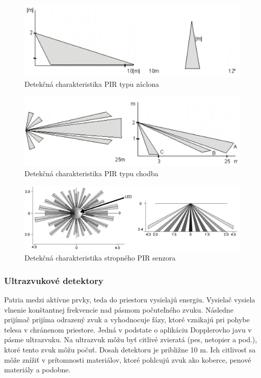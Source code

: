 \begin{figure}[!ht]
    \centering
    \includegraphics[width=0.75\linewidth]{obrazky-figures/PIR-zaclona.png}
    \caption[Detekčná charakteristika PIR typu záclona]{Detekčná charakteristika PIR typu záclona\cite{velas_ezs}}
    \label{fig:pir-zaclona}
\end{figure}

\begin{figure}[!ht]
    \centering
    \includegraphics[width=0.75\linewidth]{obrazky-figures/PIR-chodba.png}
    \caption[Detekčná charakteristika PIR typu chodba]{Detekčná charakteristika PIR typu chodba\cite{velas_ezs}}
    \label{fig:pir-chodba}
\end{figure}

\begin{figure}[!ht]
    \centering
    \includegraphics[width=0.75\linewidth]{obrazky-figures/PIR-strop.jpg}
    \caption[Detekčná charakteristika stropného PIR senzora]{Detekčná charakteristika stropného PIR senzora\cite{PIR-strop}}
    \label{fig:pir-strop}
\end{figure}

\subsubsection{Ultrazvukové detektory}

Patria medzi aktívne prvky, teda do priestoru vysielajú energiu. Vysielač vysiela vlnenie konštantnej frekvencie nad pásmom počuteľného zvuku. Následne prijímač prijíma odrazený zvuk a vyhodnocuje fázy, ktoré vznikajú pri pohybe telesa v chránenom priestore. Jedná v podstate o aplikáciu Dopplerovho javu v pásme ultrazvuku. Na ultrazvuk môžu byť citlivé zvieratá (pes, netopier a pod.), ktoré tento zvuk môžu počuť. Dosah detektoru je približne 10 m. Ich citlivosť sa môže znížiť v prítomnosti materiálov, ktoré pohlcujú zvuk ako koberce, penové materiály a podobne.\cite{Krecek}

